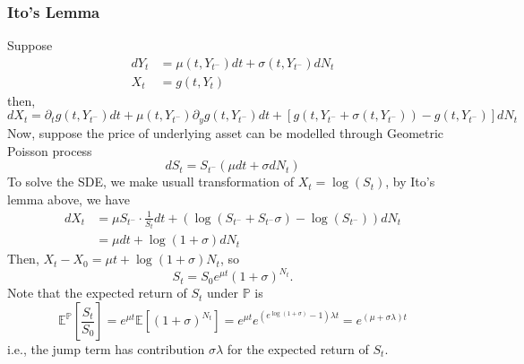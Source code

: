 \documentclass[a4paper]{article}
\begin{document}
\subsubsection*{Ito's Lemma}
Suppose \begin{align*}dY_t&=\mu(t,Y_{t^-})dt+\sigma(t,Y_{t^-})dN_t\\ X_t &= g(t,Y_t)\end{align*}
then, $$dX_t = \partial_t g(t,Y_{t^-})dt+\mu(t,Y_{t^-})\partial_y g(t,Y_{t^-})dt+\left[g(t,Y_{t^-}+\sigma(t,Y_{t^-}))-g(t,Y_{t^-})\right]dN_t$$
Now, suppose the price of underlying asset can be modelled through Geometric Poisson process
$$dS_t = S_{t^-}(\mu dt+\sigma dN_t)$$
To solve the SDE, we make usuall transformation of $X_t = \log(S_t)$, by Ito's lemma above, we have
\begin{align*}dX_t &= \mu S_{t^-}\cdot\frac{1}{S_t}dt + (\log(S_{t^-}+S_{t^-}\sigma)-\log(S_{t^-}))dN_t \\
	&=\mu dt+\log(1+\sigma)dN_t
\end{align*}
Then, $X_t-X_0 = \mu t +\log(1+\sigma)N_t$, so $$S_t = S_0 e^{\mu t}(1+\sigma)^{N_t}.$$
Note that the expected return of $S_t$ under $\mathbb{P}$ is 
$$\mathbb{E}^\mathbb{P}\left[\frac{S_t}{S_0}\right] = e^{\mu t}\mathbb{E}\left[(1+\sigma)^{N_t}\right]=e^{\mu t}e^{(e^{\log(1+\sigma)}-1)\lambda t}=e^{(\mu+\sigma\lambda)t}$$
i.e., the jump term has contribution $\sigma\lambda$ for the expected return of $S_t$. 
\end{document}
